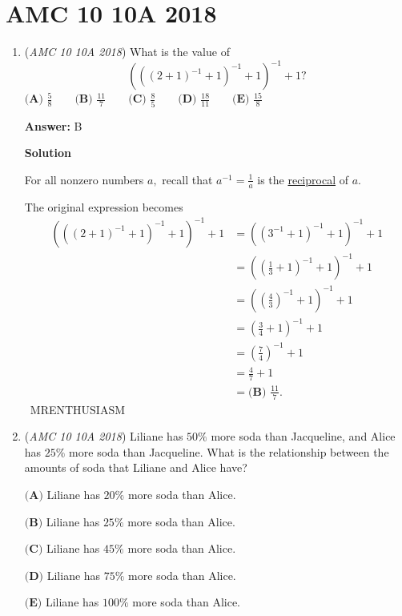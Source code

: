 \section{AMC 10 10A 2018}
        \begin{enumerate}
        	\item (\textit{AMC 10 10A 2018}) What is the value of 
 \[\left(\left((2+1)^{-1}+1\right)^{-1}+1\right)^{-1}+1?\]$\textbf{(A) } \frac58 \qquad \textbf{(B) }\frac{11}7 \qquad \textbf{(C) } \frac85 \qquad \textbf{(D) } \frac{18}{11} \qquad \textbf{(E) } \frac{15}8$

 \textbf{Answer: }B



\textbf{Solution}

For all nonzero numbers $a,$ recall that $a^{-1}=\frac1a$ is the \href{https://artofproblemsolving.com/wiki/index.php?title=Reciprocal}{reciprocal} of $a.$

 The original expression becomes
 \begin{align*} \left(\left((2+1)^{-1}+1\right)^{-1}+1\right)^{-1}+1 &= \left(\left(3^{-1}+1\right)^{-1}+1\right)^{-1}+1 \\ &= \left(\left(\frac13+1\right)^{-1}+1\right)^{-1}+1 \\ &= \left(\left(\frac43\right)^{-1}+1\right)^{-1}+1 \\ &= \left(\frac34+1\right)^{-1}+1 \\ &= \left(\frac74\right)^{-1}+1 \\ &= \frac47+1 \\ &= \boxed{\textbf{(B) }\frac{11}7}. \end{align*}
~MRENTHUSIASM

 


	\item (\textit{AMC 10 10A 2018}) Liliane has $50\%$ more soda than Jacqueline, and Alice has $25\%$ more soda than Jacqueline. What is the relationship between the amounts of soda that Liliane and Alice have?


 $\textbf{(A)}$  Liliane has $20\%$ more soda than Alice. 


 $\textbf{(B)}$  Liliane has $25\%$ more soda than Alice. 


 $\textbf{(C)}$  Liliane has $45\%$ more soda than Alice. 


 $\textbf{(D)}$  Liliane has $75\%$ more soda than Alice.


 $\textbf{(E)}$  Liliane has $100\%$ more soda than Alice.



\end{enumerate}
